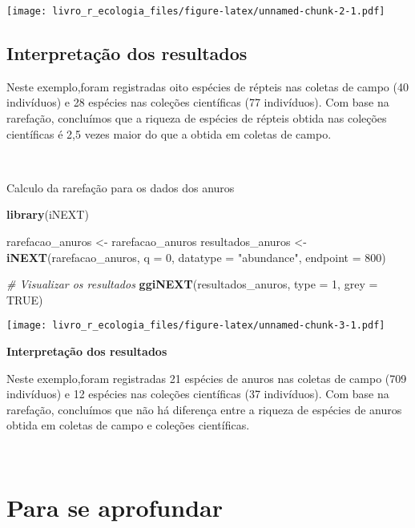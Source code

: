 \documentclass[
]{book}
\newenvironment{Shaded}{\begin{snugshade}}{\end{snugshade}}
\newcommand{\CommentTok}[1]{\textcolor[rgb]{0.56,0.35,0.01}{\textit{#1}}}
\newcommand{\DataTypeTok}[1]{\textcolor[rgb]{0.13,0.29,0.53}{#1}}
\newcommand{\DecValTok}[1]{\textcolor[rgb]{0.00,0.00,0.81}{#1}}
\newcommand{\KeywordTok}[1]{\textcolor[rgb]{0.13,0.29,0.53}{\textbf{#1}}}
\newcommand{\NormalTok}[1]{#1}
\newcommand{\OtherTok}[1]{\textcolor[rgb]{0.56,0.35,0.01}{#1}}
\newcommand{\StringTok}[1]{\textcolor[rgb]{0.31,0.60,0.02}{#1}}
\begin{document}
\texttt{[image: livro\_r\_ecologia\_files/figure-latex/unnamed-chunk-2-1.pdf]}

\hypertarget{interpretauxe7uxe3o-dos-resultados-1}{%
\subsection{Interpretação dos resultados}\label{interpretauxe7uxe3o-dos-resultados-1}}

Neste exemplo,foram registradas oito espécies de répteis nas coletas de campo (40 indivíduos) e 28 espécies nas coleções científicas (77 indivíduos). Com base na rarefação, concluímos que a riqueza de espécies de répteis obtida nas coleções científicas é 2,5 vezes maior do que a obtida em coletas de campo.

~

Calculo da rarefação para os dados dos anuros

\begin{Shaded}
\begin{Highlighting}[]
\KeywordTok{library}\NormalTok{(iNEXT)}

\NormalTok{rarefacao_anuros <-}\StringTok{ }\NormalTok{rarefacao_anuros}
\NormalTok{resultados_anuros <-}\StringTok{ }\KeywordTok{iNEXT}\NormalTok{(rarefacao_anuros, }\DataTypeTok{q =} \DecValTok{0}\NormalTok{, }\DataTypeTok{datatype =} \StringTok{"abundance"}\NormalTok{, }\DataTypeTok{endpoint =} \DecValTok{800}\NormalTok{)}

\CommentTok{# Visualizar os resultados }
\KeywordTok{ggiNEXT}\NormalTok{(resultados_anuros, }\DataTypeTok{type =} \DecValTok{1}\NormalTok{, }\DataTypeTok{grey =} \OtherTok{TRUE}\NormalTok{)}
\end{Highlighting}
\end{Shaded}

\texttt{[image: livro\_r\_ecologia\_files/figure-latex/unnamed-chunk-3-1.pdf]}

\textbf{Interpretação dos resultados}

Neste exemplo,foram registradas 21 espécies de anuros nas coletas de campo (709 indivíduos) e 12 espécies nas coleções científicas (37 indivíduos). Com base na rarefação, concluímos que não há diferença entre a riqueza de espécies de anuros obtida em coletas de campo e coleções científicas.

~

\hypertarget{para-se-aprofundar}{%
\section{Para se aprofundar}\label{para-se-aprofundar}}
\end{document}
